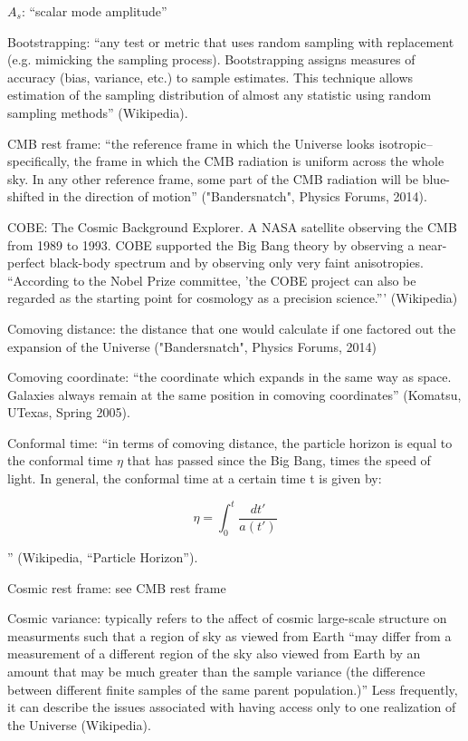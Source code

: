 \documentclass[11pt]{article}
\begin{document}
$A_s$: ``scalar mode amplitude''

Bootstrapping: ``any test or metric that uses random sampling with replacement
(e.g. mimicking the sampling process). Bootstrapping assigns measures of
accuracy (bias, variance, etc.) to sample estimates. This technique allows
estimation of the sampling distribution of almost any statistic using random
sampling methods'' (Wikipedia).

CMB rest frame: ``the reference frame in which the Universe looks
isotropic--specifically, the frame in which the CMB radiation is uniform across
the whole sky. In any other reference frame, some part of the CMB radiation
will be blue-shifted in the direction of motion'' ("Bandersnatch",
Physics Forums, 2014).

COBE: The Cosmic Background Explorer. A NASA satellite observing the CMB from
1989 to 1993. COBE supported the Big Bang theory by observing a near-perfect
black-body spectrum and by observing only very faint anisotropies. ``According
to the Nobel Prize committee, 'the COBE project can also be regarded as the
starting point for cosmology as a precision science.''' (Wikipedia)

Comoving distance: the distance that one would calculate if one factored out
the expansion of the Universe ("Bandersnatch", Physics Forums, 2014)

Comoving coordinate: ``the coordinate which expands in the same way as space.
Galaxies always remain at the same position in comoving coordinates''
(Komatsu, UTexas, Spring 2005).

Conformal time: ``in terms of comoving distance, the particle horizon is equal
to the conformal time $\eta$ that has passed since the Big Bang, times the
speed of light. In general, the conformal time at a certain time t is given by:

\begin{equation}
    \eta = \int_0^t \frac{dt'}{a(t')}
\end{equation}

'' (Wikipedia, ``Particle Horizon'').

Cosmic rest frame: see CMB rest frame

Cosmic variance: typically refers to the affect of cosmic large-scale structure
on measurments such that a region of sky as viewed from Earth ``may differ from
a measurement of a different region of the sky also viewed from Earth by an
amount that may be much greater than the sample variance (the difference
between different finite samples of the same parent population.)'' Less
frequently, it can describe the issues associated with having access only to
one realization of the Universe (Wikipedia). 
\end{document}
